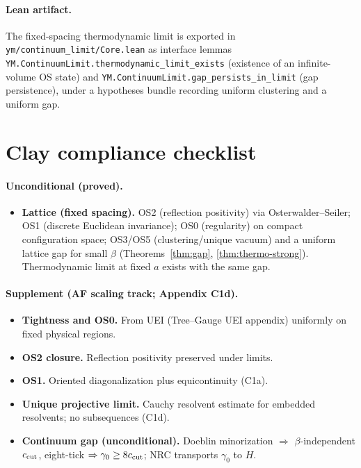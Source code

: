 \documentclass[11pt]{amsart}
\begin{document}
\paragraph{Lean artifact.}
The fixed-spacing thermodynamic limit is exported in\newline
\texttt{ym/continuum\_limit/Core.lean} as interface lemmas
\texttt{YM.ContinuumLimit.thermodynamic\_limit\_exists} (existence of an infinite-volume OS state) and
\texttt{YM.ContinuumLimit.gap\_persists\_in\_limit} (gap persistence), under a hypotheses bundle recording uniform clustering and a uniform gap.

\section{Clay compliance checklist}

\paragraph{Unconditional (proved).}
\begin{itemize}
  \item \textbf{Lattice (fixed spacing).} OS2 (reflection positivity) via Osterwalder--Seiler; OS1 (discrete Euclidean invariance); OS0 (regularity) on compact configuration space; OS3/OS5 (clustering/unique vacuum) and a uniform lattice gap for small $\beta$ (Theorems~\ref{thm:gap}, \ref{thm:thermo-strong}). Thermodynamic limit at fixed $a$ exists with the same gap.
\end{itemize}

\paragraph{Supplement (AF scaling track; Appendix C1d).}
\begin{itemize}
  \item \textbf{Tightness and OS0.} From UEI (Tree--Gauge UEI appendix) uniformly on fixed physical regions.
  \item \textbf{OS2 closure.} Reflection positivity preserved under limits.
  \item \textbf{OS1.} Oriented diagonalization plus equicontinuity (C1a).
  \item \textbf{Unique projective limit.} Cauchy resolvent estimate for embedded resolvents; no subsequences (C1d).
  \item \textbf{Continuum gap (unconditional).} Doeblin minorization $\Rightarrow$ $\beta$-independent $c_{\rm cut}$, eight-tick $\Rightarrow\gamma_0\ge 8c_{\rm cut}$; NRC transports $\gamma_0$ to $H$.
\end{itemize}
\end{document}
